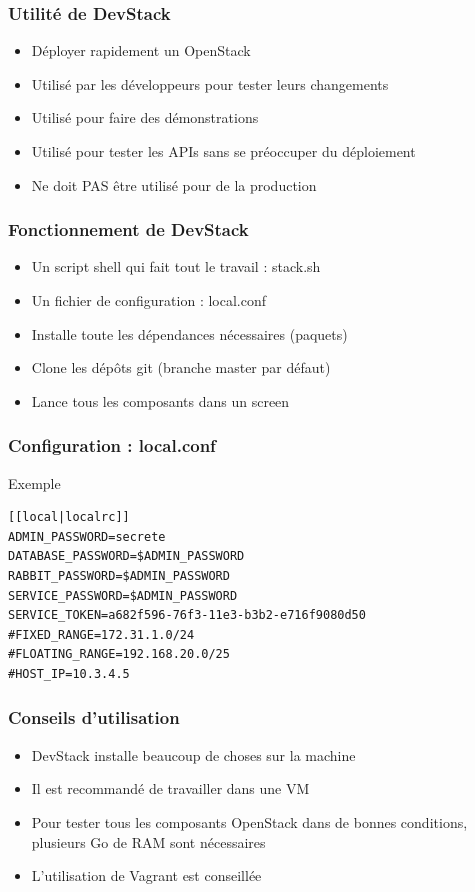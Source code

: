   \begin{frame}
    \frametitle{Utilité de DevStack}
    \begin{itemize}
      \item Déployer rapidement un OpenStack
      \item Utilisé par les développeurs pour tester leurs changements
      \item Utilisé pour faire des démonstrations
      \item Utilisé pour tester les APIs sans se préoccuper du déploiement
      \item Ne doit PAS être utilisé pour de la production
    \end{itemize}
  \end{frame}

  \begin{frame}
    \frametitle{Fonctionnement de DevStack}
    \begin{itemize}
      \item Un script shell qui fait tout le travail : stack.sh
      \item Un fichier de configuration : local.conf
      \item Installe toute les dépendances nécessaires (paquets)
      \item Clone les dépôts git (branche master par défaut)
      \item Lance tous les composants dans un screen
    \end{itemize}
  \end{frame}

  \begin{frame}[containsverbatim]
    \frametitle{Configuration : local.conf}
    Exemple
\begin{verbatim}
[[local|localrc]]
ADMIN_PASSWORD=secrete
DATABASE_PASSWORD=$ADMIN_PASSWORD
RABBIT_PASSWORD=$ADMIN_PASSWORD
SERVICE_PASSWORD=$ADMIN_PASSWORD
SERVICE_TOKEN=a682f596-76f3-11e3-b3b2-e716f9080d50
#FIXED_RANGE=172.31.1.0/24
#FLOATING_RANGE=192.168.20.0/25
#HOST_IP=10.3.4.5
\end{verbatim}
  \end{frame}

  \begin{frame}
    \frametitle{Conseils d'utilisation}
    \begin{itemize}
      \item DevStack installe beaucoup de choses sur la machine
      \item Il est recommandé de travailler dans une VM
      \item Pour tester tous les composants OpenStack dans de bonnes conditions, plusieurs Go de RAM sont nécessaires
      \item L'utilisation de Vagrant est conseillée
    \end{itemize}
  \end{frame}

